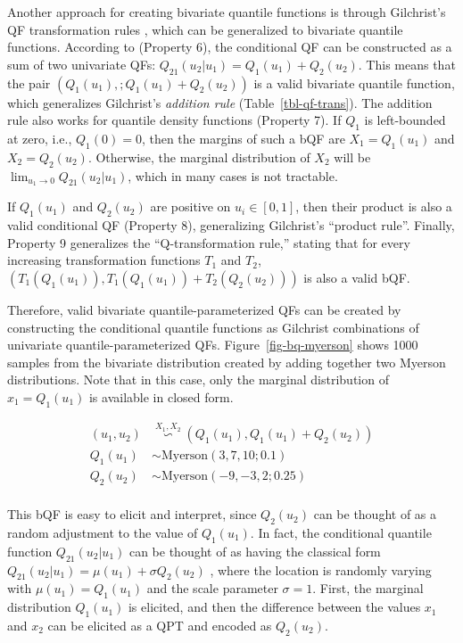 \documentclass[
  fleqn,
  deca,
  blindrev
]{informs4}
\begin{document}
Another approach for creating bivariate quantile functions is through
Gilchrist's QF transformation rules
\citep{gilchrist2000StatisticalModellingQuantile}, which can be
generalized to bivariate quantile functions. According to
\citet{nair2023PropertiesBivariateDistributions} (Property 6), the
conditional QF can be constructed as a sum of two univariate QFs:
\(Q_{21}(u_2\vert u_1) = Q_1(u_1) + Q_2(u_2)\). This means that the pair
\((Q_1(u_1), ; Q_1(u_1) + Q_2(u_2))\) is a valid bivariate quantile
function, which generalizes Gilchrist's \emph{addition rule}
(Table~\ref{tbl-qf-trans}). The addition rule also works for quantile
density functions (Property 7). If \(Q_1\) is left-bounded at zero,
i.e., \(Q_1(0) = 0\), then the margins of such a bQF are
\(X_1 = Q_1(u_1)\) and \(X_2 = Q_2(u_2)\). Otherwise, the marginal
distribution of \(X_2\) will be
\(\lim_{u_1 \rightarrow 0}Q_{21}(u_2\vert u_1)\), which in many cases is
not tractable.

If \(Q_1(u_1)\) and \(Q_2(u_2)\) are positive on \(u_i \in [0,1]\), then
their product is also a valid conditional QF (Property 8), generalizing
Gilchrist's ``product rule''. Finally, Property 9 generalizes the
``Q-transformation rule,'' stating that for every increasing
transformation functions \(T_1\) and \(T_2\),
\(\left(T_1(Q_1(u_1)), T_1(Q_1(u_1)) + T_2(Q_2(u_2))\right)\) is also a
valid bQF.

Therefore, valid bivariate quantile-parameterized QFs can be created by
constructing the conditional quantile functions as Gilchrist
combinations of univariate quantile-parameterized QFs.
Figure~\ref{fig-bq-myerson} shows 1000 samples from the bivariate
distribution created by adding together two Myerson distributions. Note
that in this case, only the marginal distribution of \(x_1 = Q_1(u_1)\)
is available in closed form.

\[
\begin{aligned}
(u_1, u_2) &\overset{X_1, X_2}{\backsim} (Q_1(u_1), Q_1(u_1)+Q_2(u_2))\\
Q_1(u_1) &\sim\text{Myerson}(3,7,10; 0.1)\\
Q_2(u_2) &\sim \text{Myerson}(-9, -3, 2; 0.25)\\
\end{aligned}
\]

This bQF is easy to elicit and interpret, since \(Q_2(u_2)\) can be
thought of as a random adjustment to the value of \(Q_1(u_1)\). In fact,
the conditional quantile function \(Q_{21}(u_2\vert u_1)\) can be
thought of as having the classical form
\(Q_{21}(u_2\vert u_1) = \mu(u_1) + \sigma Q_2(u_2)\)
\citep{gilchrist2000StatisticalModellingQuantile}, where the location is
randomly varying with \(\mu(u_1) = Q_1(u_1)\) and the scale parameter
\(\sigma = 1\). First, the marginal distribution \(Q_1(u_1)\) is
elicited, and then the difference between the values \(x_1\) and \(x_2\)
can be elicited as a QPT and encoded as \(Q_2(u_2)\).
\end{document}
